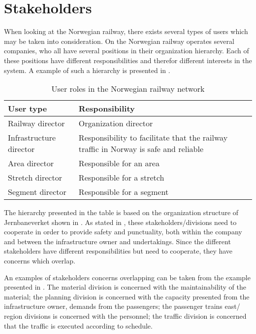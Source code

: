 
\section{Stakeholders} %
\label{sec:back_stakeholders}
When looking at the Norwegian railway, there exists several types of users which
may be taken into consideration. On the Norwegian railway operates several
companies, who all have several positions in their organization hierarchy. Each
of these positions have different responsibilities and therefor different
interests in the system. A example of such a hierarchy is presented in
.

\begin{table}[!h]\small
	\begin{tabularx}{\textwidth}{|l|X|}
		\hline
		User type & Responsibility \\
		\hline
		Railway director & Organization director\\
		\hline
		Infrastructure director & Responsibility to facilitate that the railway traffic in Norway is safe and reliable\\
		\hline
		Area director & Responsible for an area\\
		\hline
		Stretch director & Responsible for a stretch\\
		\hline
		Segment director & Responsible for a segment\\
		\hline
	\end{tabularx}
\caption{User roles in the Norwegian railway network}
\label{table:user_roles}
\end{table}

The hierarchy presented in the table is based on the organization structure of
Jernbaneverket shown in . As stated in
, these stakeholders/divisions need to cooperate 
in order to provide safety and punctuality, both within the company and 
between the infrastructure owner and undertakings. Since the different 
stakeholders have different responsibilities but need to cooperate, they have 
concerns which overlap. 

An examples of stakeholders concerns overlapping can 
be taken from the example presented in . The 
material division is concerned with the maintainability of the material; the 
planning division is concerned with the capacity presented from the 
infrastructure owner, demands from the passengers; the passenger trains east/
region divisions is concerned with the personnel; the traffic division is
concerned that the traffic is executed according to schedule. 

